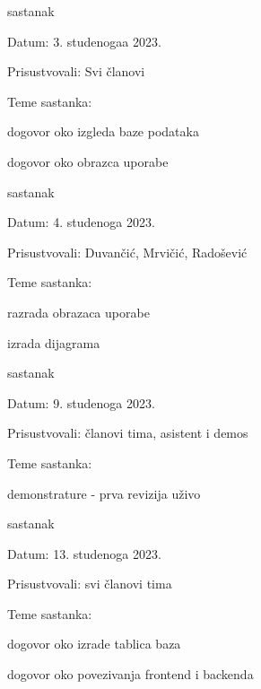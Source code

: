 \begin{packed_enum}
			\item  sastanak
			\item[] \begin{packed_item}
				\item Datum: 3. studenogaa 2023.
				\item Prisustvovali: Svi članovi
				\item Teme sastanka:
				\begin{packed_item}
					\item  dogovor oko izgleda baze podataka
					\item dogovor oko obrazca uporabe
				\end{packed_item}
			\end{packed_item}
			
			\item  sastanak
			\item[] \begin{packed_item}
				\item Datum: 4. studenoga 2023.
				\item Prisustvovali: Duvančić, Mrvičić, Radošević
				\item Teme sastanka:
				\begin{packed_item}
					\item  razrada obrazaca uporabe
					\item  izrada dijagrama
				\end{packed_item}
			\end{packed_item}
			
			\item  sastanak
			\item[] \begin{packed_item}
				\item Datum: 9. studenoga 2023.
				\item Prisustvovali: članovi tima, asistent i demos
				\item Teme sastanka:
				\begin{packed_item}
					\item  demonstrature - prva revizija uživo
				\end{packed_item}
			\end{packed_item}
			
			\item  sastanak
			\item[] \begin{packed_item}
				\item Datum: 13. studenoga 2023.
				\item Prisustvovali: svi članovi tima
				\item Teme sastanka:
				\begin{packed_item}
					\item  dogovor oko izrade tablica baza
					\item  dogovor oko povezivanja frontend i backenda
				\end{packed_item}
			\end{packed_item}
			

\end{packed_enum}
